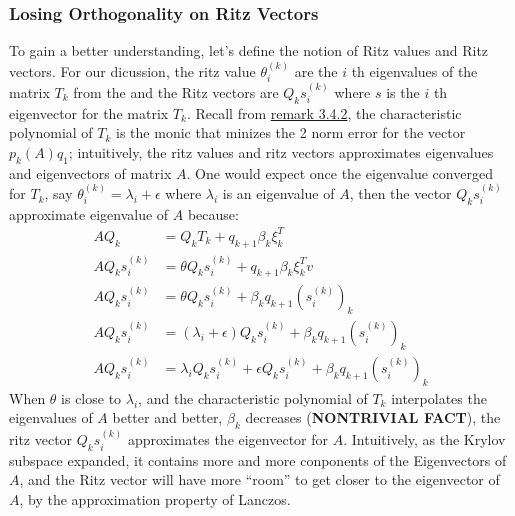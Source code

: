\documentclass[]{article}
\theoremstyle{definition}
\begin{document}
        \subsubsection{Losing Orthogonality on Ritz Vectors}
            To gain a better understanding, let's define the notion of Ritz values and Ritz vectors. For our dicussion, the ritz value $\theta_i^{(k)}$ are the $i$ th eigenvalues of the matrix $T_k$ from the and the Ritz vectors are $Q_ks_{i}^{(k)}$ where $s$ is the $i$ th eigenvector for the matrix $T_k$. Recall from \hyperref[remark:Minimal_Polynomial_from_Lanczos_Iterations]{remark 3.4.2}, the characteristic polynomial of $T_k$ is the monic that minizes the 2 norm error for the vector $p_k(A)q_1$; intuitively, the ritz values and ritz vectors approximates eigenvalues and eigenvectors of matrix $A$. One would expect once the eigenvalue converged for $T_k$, say $\theta_i^{(k)} = \lambda_i + \epsilon$ where $\lambda_i$ is an eigenvalue of $A$, then the vector $Q_ks_i^{(k)}$ approximate eigenvalue of $A$ because: 
            \begin{align}
                AQ_k &= Q_k T_k + q_{k + 1}\beta_k\xi_k^T
                \\
                AQ_ks_i^{(k)} &= \theta Q_k s_i^{(k)} + q_{k + 1}\beta_k \xi_k^Tv
                \\
                AQ_ks_i^{(k)} &= \theta Q_k s_i^{(k)} + \beta_kq_{k + 1}(s_i^{(k)})_k
                \\
                AQ_ks_i^{(k)} &= (\lambda_i + \epsilon) Q_k s_i^{(k)} + \beta_kq_{k + 1}(s_i^{(k)})_k
                \\
                AQ_ks_i^{(k)} &= \lambda_i Q_k s_i^{(k)} + \epsilon Q_k s_i^{(k)} + \beta_kq_{k + 1}(s_i^{(k)})_k
            \end{align}
            When $\theta$ is close to $\lambda_i$, and the characteristic polynomial of $T_k$ interpolates the eigenvalues of $A$ better and better, $\beta_k$ decreases (\textbf{NONTRIVIAL FACT}), the ritz vector $Q_ks_i^{(k)}$ approximates the eigenvector for $A$. Intuitively, as the Krylov subspace expanded, it contains more and more conponents of the Eigenvectors of $A$, and the Ritz vector will have more ``room'' to get closer to the eigenvector of $A$, by the approximation property of Lanczos. 
            \par
\end{document}
